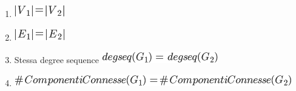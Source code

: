 \documentclass{article}
\providecommand{\tightlist}{%
  \setlength{\itemsep}{0pt}\setlength{\parskip}{0pt}}
\begin{document}
{{{\begin{enumerate}
\tightlist
\item
  \includegraphics{images/image434.png}
\item
  \includegraphics{images/image435.png}
\item
  {Stessa degree sequence }\includegraphics{images/image436.png}
\item
  \includegraphics{images/image437.png}
\end{enumerate}

{}

{}

\protect\hypertarget{t.b6067c6d36f86489b9093689693d69077c2015d4}{}{}\protect\hypertarget{t.39}{}{}

}}}
\end{document}
